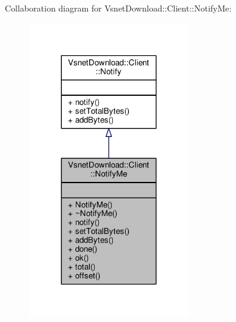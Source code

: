 Collaboration diagram for Vsnet\+Download\+:\+:Client\+:\+:Notify\+Me\+:
\nopagebreak
\begin{figure}[H]
\begin{center}
\leavevmode
\includegraphics[width=197pt]{d4/d31/classVsnetDownload_1_1Client_1_1NotifyMe__coll__graph}
\end{center}
\end{figure}
